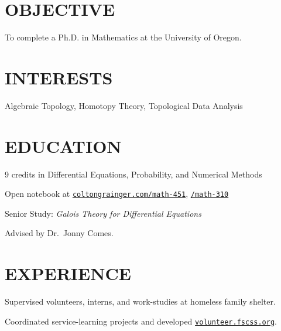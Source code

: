 \documentclass[margin]{res}
\begin{document}
\begin{resume}

\printheader
\section{OBJECTIVE}

To complete a Ph.D. in Mathematics at the University of Oregon.

\section{INTERESTS}

Algebraic Topology, Homotopy Theory, Topological Data Analysis 

\section{EDUCATION}

\begin{details}
\item 9 credits in Differential Equations, Probability, and Numerical Methods
\item Open notebook at \href{http://coltongrainger.com/math-451}{\texttt{coltongrainger.com/math-451}}, \href{http://coltongrainger.com/math-310}{\texttt{/math-310}}
\end{details}

\begin{details}
\item Senior Study: \emph{Galois Theory for Differential Equations}
\item Advised by Dr.~Jonny Comes.
\end{details}

\section{EXPERIENCE}

\begin{details}
\item{Supervised volunteers, interns, and work-studies at homeless family shelter.}
\item{Coordinated service-learning projects and developed \href{http://volunteer.fscss.org}{\texttt{volunteer.fscss.org}}.}
\end{details}


\end{resume}
\end{document}
